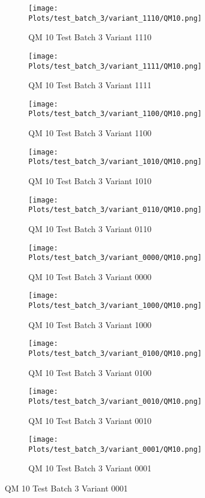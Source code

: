 \documentclass{DissertateFigs}
\begin{document}
\begin{figure}[t!]
    \begin{subfigure}{0.47\textwidth}
    \texttt{[image: Plots/test\_batch\_3/variant\_1110/QM10.png]}
    \caption{QM 10 Test Batch 3 Variant 1110}
    \end{subfigure}
    \begin{subfigure}{0.47\textwidth}
    \texttt{[image: Plots/test\_batch\_3/variant\_1111/QM10.png]}
    \caption{QM 10 Test Batch 3 Variant 1111}
    \end{subfigure}

\medskip

    \begin{subfigure}{0.47\textwidth}
    \texttt{[image: Plots/test\_batch\_3/variant\_1100/QM10.png]}
    \caption{QM 10 Test Batch 3 Variant 1100}
    \end{subfigure}
    \begin{subfigure}{0.47\textwidth}
    \texttt{[image: Plots/test\_batch\_3/variant\_1010/QM10.png]}
    \caption{QM 10 Test Batch 3 Variant 1010}
    \end{subfigure}

\medskip

    \begin{subfigure}{0.47\textwidth}
    \texttt{[image: Plots/test\_batch\_3/variant\_0110/QM10.png]}
    \caption{QM 10 Test Batch 3 Variant 0110}
    \end{subfigure}
    \begin{subfigure}{0.47\textwidth}
    \texttt{[image: Plots/test\_batch\_3/variant\_0000/QM10.png]}
    \caption{QM 10 Test Batch 3 Variant 0000}
    \end{subfigure}

\medskip

    \begin{subfigure}{0.47\textwidth}
    \texttt{[image: Plots/test\_batch\_3/variant\_1000/QM10.png]}
    \caption{QM 10 Test Batch 3 Variant 1000}
    \end{subfigure}
    \begin{subfigure}{0.47\textwidth}
    \texttt{[image: Plots/test\_batch\_3/variant\_0100/QM10.png]}
    \caption{QM 10 Test Batch 3 Variant 0100}
    \end{subfigure}

\medskip

    \begin{subfigure}{0.47\textwidth}
    \texttt{[image: Plots/test\_batch\_3/variant\_0010/QM10.png]}
    \caption{QM 10 Test Batch 3 Variant 0010}
    \end{subfigure}
    \begin{subfigure}{0.47\textwidth}
    \texttt{[image: Plots/test\_batch\_3/variant\_0001/QM10.png]}
    \caption{QM 10 Test Batch 3 Variant 0001}
    \end{subfigure}


\end{figure}
\end{document}
